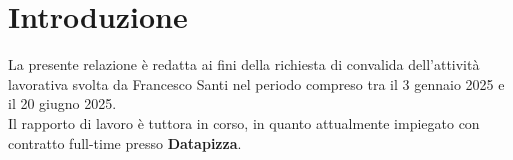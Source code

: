 \chapter{Introduzione}
La presente relazione è redatta ai fini della richiesta di convalida dell'attività lavorativa svolta da Francesco Santi nel periodo compreso tra il 3 gennaio 2025 e il 20 giugno 2025.\\
Il rapporto di lavoro è tuttora in corso, in quanto attualmente impiegato con contratto full-time presso \textbf{Datapizza}.